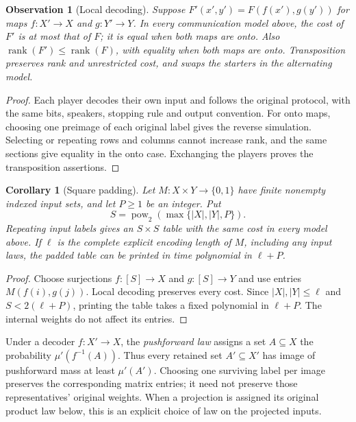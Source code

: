 \documentclass[11pt]{article} \usepackage[utf8]{inputenc}
\theoremstyle{plain} \newtheorem{theorem}{Theorem}[section]
\newtheorem{corollary}[corollary]{Corollary} \aliascntresetthe{corollary}
\newtheorem{observation}[observation]{Observation}
\theoremstyle{definition} \newaliascnt{definition}{theorem}
\DeclareMathOperator{\rank}{rank} \crefname{claim}{Claim}{Claims}
\begin{document}
\begin{observation}[Local decoding]\label{obs:local-decoding}
Suppose $F'(x',y')=F(f(x'),g(y'))$ for maps $f:X'\to X$ and $g:Y'\to Y$.
In every communication model above, the cost of $F'$ is at most that of
$F$; it is equal when both maps are onto. Also
$\rank(F')\le\rank(F)$, with equality when both maps are onto.
Transposition preserves rank and unrestricted cost, and swaps the
starters in the alternating model.
\end{observation}
\begin{proof}
Each player decodes their own input and follows the original protocol,
with the same bits, speakers, stopping rule and output convention.
For onto maps, choosing one preimage of each original label gives the
reverse simulation. Selecting or repeating rows and columns cannot
increase rank, and the same sections give equality in the onto case.
Exchanging the players proves the transposition assertions.
\end{proof}

\begin{corollary}[Square padding]\label{cor:dyadic-padding}
Let $M:X\times Y\to\{0,1\}$ have finite nonempty indexed input sets, and
let $P\ge1$ be an integer. Put
\[
S=\operatorname{pow}_2(\max\{|X|,|Y|,P\}).
\]
Repeating input labels gives an $S\times S$ table with the same cost in
every model above. If $\ell$ is the complete explicit encoding length of
$M$, including any input laws, the padded table can be printed in time
polynomial in $\ell+P$.
\end{corollary}
\begin{proof}
Choose surjections $f:[S]\to X$ and $g:[S]\to Y$ and use entries
$M(f(i),g(j))$. Local decoding preserves every cost.
Since $|X|,|Y|\le\ell$ and $S<2(\ell+P)$, printing the table takes a
fixed polynomial in $\ell+P$. The internal weights do not affect its entries.
\end{proof}

Under a decoder $f:X'\to X$, the \emph{pushforward law} assigns a set
$A\subseteq X$ the probability $\mu'(f^{-1}(A))$. Thus every retained
set $A'\subseteq X'$ has image of pushforward mass at least $\mu'(A')$.
Choosing one surviving label per image preserves the corresponding matrix
entries; it need not preserve those representatives' original weights.
When a projection is assigned its original product law below, this is an
explicit choice of law on the projected inputs.
\end{document}
